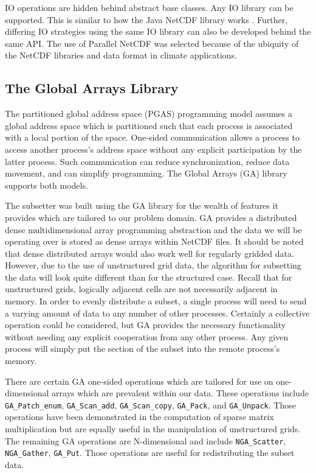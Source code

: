 IO operations are hidden behind abstract base classes.  Any IO library can be
supported.  This is similar to how the Java NetCDF library works
\cite{JavaNetCDF}.  Further, differing IO strategies using the same IO library
can also be developed behind the same API.  The use of Parallel NetCDF was
selected because of the ubiquity of the NetCDF libraries and data format in
climate applications.

\subsection{The Global Arrays Library}

The partitioned global address space (PGAS) programming model assumes a global
address space which is partitioned such that each process is associated with a
local portion of the space.  One-sided communication allows a process to
access another process's address space without any explicit participation by
the latter process.  Such communication can reduce synchronization, reduce
data movement, and can simplify programming.  The Global Arrays (GA) library
supports both models.

The subsetter was built using the GA library for the wealth of features it
provides which are tailored to our problem domain.  GA provides a distributed
dense multidimensional array programming abstraction and the data we will be
operating over is stored as dense arrays within NetCDF files.  It should be
noted that dense distributed arrays would also work well for regularly gridded
data.  However, due to the use of unstructured grid data, the algorithm for
subsetting the data will look quite different than for the structured case.
Recall that for unstructured grids, logically adjacent cells are not
necessarily adjacent in memory.  In order to evenly distribute a subset, a
single process will need to send a varying amount of data to any number of
other processes.  Certainly a collective operation could be considered, but GA
provides the necessary functionality without needing any explicit cooperation
from any other process.  Any given process will simply put the section of the
subset into the remote process's memory.

There are certain GA one-sided operations which are tailored for use on
one-dimensional arrays which are prevalent within our data.  These operations
include \verb=GA_Patch_enum=, \verb=GA_Scan_add=, \verb=GA_Scan_copy=,
\verb=GA_Pack=, and \verb=GA_Unpack=.  Those operations have been demonstrated
in the computation of sparse matrix multiplication\cite{GA} but are equally
useful in the manipulation of unstructured grids.  The remaining GA operations
are N-dimensional and include \verb=NGA_Scatter=, \verb=NGA_Gather=,
\verb=GA_Put=.  Those operations are useful for redistributing the subset
data.

